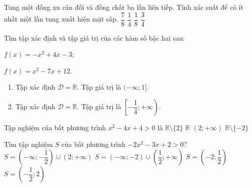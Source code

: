 \begin{ex}%
	Tung một đồng xu cân đối và đồng  chất ba lần liên tiếp. Tính xác suất để có ít nhất một lần tung xuất hiện mặt sấp.
	\choice 
		{\True  $\dfrac{7}{8}$}
		 {$\dfrac{1}{4}$}
		 {$\dfrac{1}{8}$}
		 {$\dfrac{3}{4}$}
\end{ex}

\begin{bt}%
	Tìm tập xác định và tập giá trị của các hàm số bậc hai sau:
	\begin{listEX}[2]
		\item $f(x)=-x^2+4 x-3$;
		\item $f(x)=x^2-7 x+12$.
	\end{listEX}
	\loigiai
	{
		\begin{enumerate}
			\item Tập xác định $\mathscr{D}=\mathbb{R}$. Tập giá trị là $(-\infty; 1]$.
			\item Tập xác định $\mathscr{D}=\mathbb{R}$. Tập giá trị là $\left[-\dfrac{1}{4};+\infty\right)$.			
		\end{enumerate}
	}
\end{bt}

\begin{ex}%
	Tập nghiệm của bất phương trình $x^2-4  x+4>0$ là
	\choice 
		{\True $\mathbb{R} \setminus\{2\}$} 
		{$\mathbb{R}$} 
		{$(2;+\infty)$} 
		{$\mathbb{R} \setminus\{-2\}$} 
\end{ex}

\begin{ex}%
	Tìm tập  nghiệm $S$ của bất phương trình $-2x^{2}-3x+2>0$?\\
	\choice 
		{$S=\left(-\infty;-\dfrac{1}{2}\right)\cup(2;+\infty)$} 
		{$S=(-\infty;-2)\cup\left(\dfrac{1}{2};+\infty\right)$} 
		{\True $S=\left(-2;\dfrac{1}{2}\right)$} 
		{$S=\left(-\dfrac{1}{2};2\right)$} 
\end{ex}

